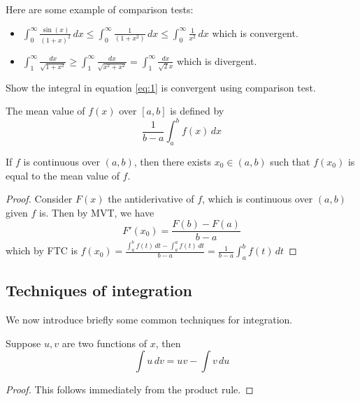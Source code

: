 \documentclass[11pt]{article}
\begin{document}
\begin{example}
  Here are some example of comparison tests:
  \begin{itemize}
    \item \(\int_0^\infty \frac{\sin(x)}{(1+x)^2}\,dx \leq \int_0^\infty \frac{1}{(1+x^2)}\,dx \leq \int_0^\infty \frac{1}{x^2}\,dx\) which is convergent.
    \item \(\int_1^\infty\frac{dx}{\sqrt{1+x^2}}\geq \int_1^\infty\frac{dx}{\sqrt{x^2+x^2}}=\int_1^\infty \frac{dx}{\sqrt{2}x}\) which is divergent.
  \end{itemize}
\end{example}
\begin{exercise}
  Show the integral in equation \ref{eq:1} is convergent using comparison test.
\end{exercise}

\begin{definition}
  The mean value of \(f(x)\) over \([a,b]\) is defined by
  \[\frac{1}{b-a}\int_a^bf(x)\,dx\]
\end{definition}

\begin{theorem}
  If \(f\) is continuous over \((a,b)\), then there exists \(x_0\in (a,b)\) such that \(f(x_0)\) is equal to the mean value of \(f\).
\end{theorem}
\begin{proof}
  Consider \(F(x)\) the antiderivative of \(f\), which is continuous over \((a,b)\) given \(f\) is. Then by MVT, we have
  \[F'(x_0)=\frac{F(b)-F(a)}{b-a}\]
  which by FTC is 
  \(f(x_0)=\frac{\int_a^bf(t)\,dt-\int_a^af(t)\,dt}{b-a}=\frac{1}{b-a}\int_a^bf(t)\,dt\)
\end{proof}

\subsection{Techniques of integration}
We now introduce briefly some common techniques for integration.
\begin{theorem}
  Suppose \(u,v\) are two functions of \(x\), then 
  \[\int u\,dv=uv-\int v\,du\]
\end{theorem}
\begin{proof}
  This follows immediately from the product rule.%
\end{proof}
\end{document}
